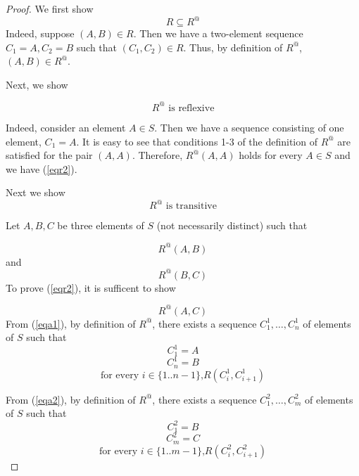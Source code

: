 \documentclass[a4paper,12pt]{article}
\begin{document}
\begin{proof}
We first show
\begin{equation}\label{eqr1}
R\subseteq R^@
\end{equation}
Indeed, suppose $(A,B) \in R$. Then we have a two-element sequence $C_1 = A, C_2 = B$ such that $(C_1,C_2) \in R$. Thus, by definition of $R^@$, $(A,B) \in R^@$.

\noindent
Next, we show

\begin{equation}\label{eqr2}
R^@ \mbox{ is reflexive}
\end{equation}

\noindent
Indeed, consider an element  $A \in S$. Then we have a sequence consisting of one element, $C_1 = A$. It is easy to see that conditions 1-3 of the definition of $R^@$ are satisfied for the pair $(A,A)$.
Therefore, $R^@(A,A)$ holds for every $A \in S$ and we have (\ref{eqr2}). 

\noindent
Next we show 
\begin{equation}\label{eqr3}
R^@ \mbox{ is transitive}
\end{equation}

\noindent
Let $A,B,C$ be three elements of $S$ (not necessarily distinct) such that 

\begin{equation}\label{eqa1}
R^@(A,B)
\end{equation}
and
\begin{equation}\label{eqa2}
R^@(B,C)
\end{equation}
To prove (\ref{eqr2}), it is sufficent to show

\begin{equation}\label{eqa3}
R^@(A,C)
\end{equation}
From (\ref{eqa1}), by definition of $R^@$, there exists a sequence $C^1_1,\ldots,C_n^1$ of elements of $S$ such that
\begin{equation}\label{boo}
C^1_1 = A
\end{equation}
\begin{equation}
C^1_n = B
\end{equation}
\begin{equation}
\mbox{for every $i \in \{1..n-1\}$,} R(C^1_i,C^1_{i+1})
\end{equation}

From (\ref{eqa2}), by definition of $R^@$, there exists a sequence $C^2_1,\ldots,C_m^2$ of elements of $S$ such that
\begin{equation}
C^2_1 = B
\end{equation}
\begin{equation}
C^2_m = C
\end{equation}
\begin{equation}\label{boon}
\mbox{for every $i \in \{1..m-1\}$,} R(C^2_i,C^2_{i+1})
\end{equation}


\end{proof}
\end{document}
